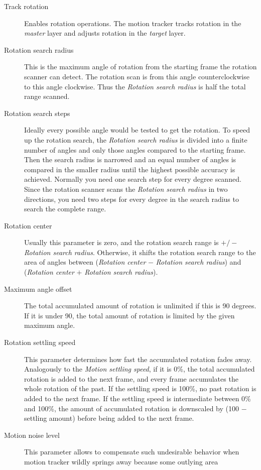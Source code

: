 \begin{description}
    \item[Track rotation] Enables rotation operations. The motion tracker tracks rotation in the \textit{master} layer and adjusts rotation in the \textit{target} layer.    
    \item[Rotation search radius] This is the maximum angle of rotation from the starting frame the rotation scanner can detect. The rotation scan is from this angle counterclockwise to this angle clockwise. Thus the \textit{Rotation search radius} is half the total range scanned.
    \item[Rotation search steps] Ideally every possible angle would be tested to get the rotation. To speed up the rotation search, the \textit{Rotation search radius} is divided into a finite number of angles and only those angles compared to the starting frame. Then the search radius is narrowed and an equal number of angles is compared in the smaller radius until the highest possible accuracy is achieved. Normally you need one search step for every degree scanned. Since the rotation scanner scans the \textit{Rotation search radius} in two directions, you need two steps for every degree in the search radius to search the complete range.
    \item[Rotation center] Usually this parameter is zero, and the rotation search
    range is $+/-$ \textit{Rotation search radius}.  Otherwise, it shifts the rotation search range to the area of angles between (\textit{Rotation center} $-$ \textit{Rotation search radius}) and (\textit{Rotation center} $+$ \textit{Rotation search radius}).
    \item[Maximum angle offset] The total accumulated amount of rotation is unlimited
    if this is 90 degrees.  If it is under 90, the total amount of rotation is
    limited by the given maximum angle.
    \item[Rotation settling speed] This parameter determines how fast the accumulated
    rotation fades away.  Analogously to the \textit{Motion settling speed}, if it is 0\%,
    the total accumulated rotation is added to the next frame, and every frame
    accumulates the whole rotation of the past.  If the settling speed is 100\%,
    no past rotation is added to the next frame.  If the settling speed is
    intermediate between 0\% and 100\%, the amount of accumulated rotation is
    downscaled by (100 $-$ settling amount) before being added to the next frame.
    \item[Motion noise level] This parameter allows to compensate such undesirable
    behavior when motion tracker wildly springs away because some outlying area

\end{description}
